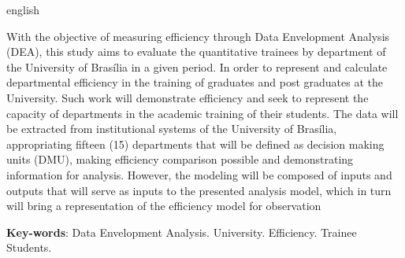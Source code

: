 \begin{resumo}[Abstract]
 \begin{otherlanguage*}{english}
  
    With the objective of measuring efficiency through Data Envelopment Analysis (DEA), this study aims to evaluate the quantitative trainees by department of the University of Brasília in a given period. In order to represent and calculate departmental efficiency in the training of graduates and post graduates at the University. Such work will demonstrate efficiency and seek to represent the capacity of departments in the academic training of their students. The data will be extracted from institutional systems of the University of Brasília, appropriating fifteen (15) departments that will be defined as decision making units (DMU), making efficiency comparison possible and demonstrating information for analysis.
    However, the modeling will be composed of inputs and outputs that will serve as inputs to the presented analysis model, which in turn will bring a representation of the efficiency model for observation
   
   \vspace{\onelineskip}
 
   \noindent 
   \textbf{Key-words}: Data Envelopment Analysis. University. Efficiency. Trainee Students.
 \end{otherlanguage*}
\end{resumo}
